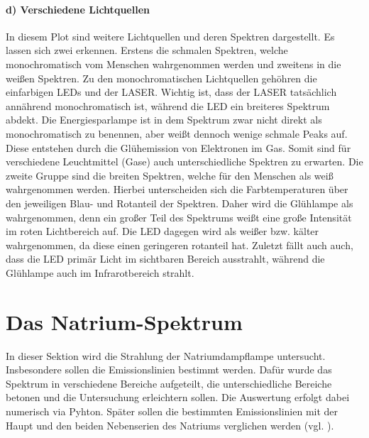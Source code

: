 \paragraph{d) Verschiedene Lichtquellen}
In diesem Plot sind weitere Lichtquellen und deren Spektren dargestellt. Es lassen sich zwei erkennen. Erstens die schmalen Spektren, welche monochromatisch vom Menschen wahrgenommen werden und zweitens in die weißen Spektren. 
Zu den monochromatischen Lichtquellen gehöhren die einfarbigen LEDs und der LASER. Wichtig ist, dass der LASER tatsächlich annährend monochromatisch ist, während die LED ein breiteres Spektrum abdekt. Die Energiesparlampe ist in dem Spektrum zwar nicht direkt als monochromatisch zu benennen, aber weißt dennoch wenige schmale Peaks auf. Diese entstehen durch die Glühemission von Elektronen im Gas. Somit sind für verschiedene Leuchtmittel (Gase) auch unterschiedliche Spektren zu erwarten. 
Die zweite Gruppe sind die breiten Spektren, welche für den Menschen als weiß wahrgenommen werden. Hierbei unterscheiden sich die Farbtemperaturen über den jeweiligen Blau- und Rotanteil der Spektren. Daher wird die Glühlampe als wahrgenommen, denn ein großer Teil des Spektrums weißt eine große Intensität im roten Lichtbereich auf. Die LED dagegen wird als weißer bzw. kälter  wahrgenommen, da diese einen geringeren rotanteil hat. 
Zuletzt fällt auch auch, dass die LED primär Licht im sichtbaren Bereich ausstrahlt, während die Glühlampe auch im Infrarotbereich strahlt.


\twocolumn\onecolumn 


\section{Das Natrium-Spektrum}
\label{sec:A3}
In dieser Sektion wird die Strahlung der Natriumdampflampe untersucht. Insbesondere sollen die Emissionslinien bestimmt werden. Dafür wurde das Spektrum in verschiedene Bereiche aufgeteilt, die unterschiedliche Bereiche betonen und die Untersuchung erleichtern sollen. Die Auswertung erfolgt dabei numerisch via Pyhton. 
Später sollen die bestimmten Emissionslinien mit der Haupt und den beiden Nebenserien des Natriums verglichen werden (vgl. ).
